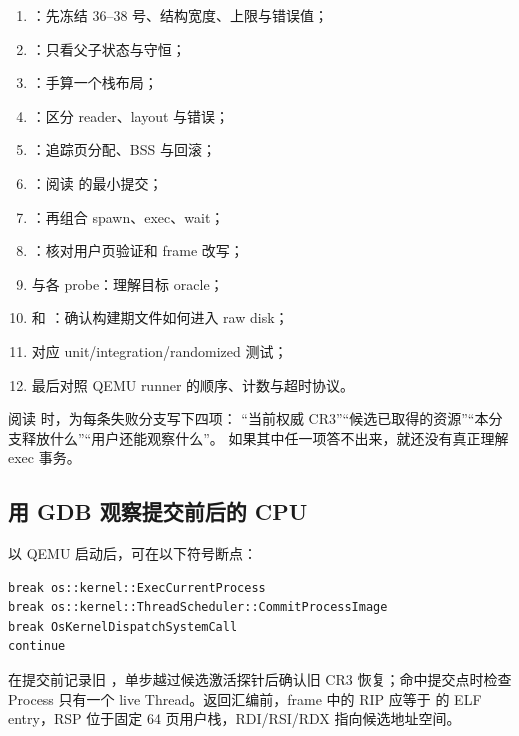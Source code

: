 \begin{enumerate}
  \item {}：先冻结 36--38
        号、结构宽度、上限与错误值；
  \item {}：只看父子状态与守恒；
  \item {}：手算一个栈布局；
  \item {}：区分 reader、layout 与错误；
  \item {}：追踪页分配、BSS 与回滚；
  \item {}：阅读
         的最小提交；
  \item {}：再组合 spawn、exec、wait；
  \item {}：核对用户页验证和 frame 改写；
  \item {} 与各 probe：理解目标 oracle；
  \item {} 和
        ：确认构建期文件如何进入 raw disk；
  \item 对应 unit/integration/randomized 测试；
  \item 最后对照 QEMU runner 的顺序、计数与超时协议。
\end{enumerate}

阅读  时，为每条失败分支写下四项：
“当前权威 CR3”“候选已取得的资源”“本分支释放什么”“用户还能观察什么”。
如果其中任一项答不出来，就还没有真正理解 exec 事务。

\subsection{用 GDB 观察提交前后的 CPU}

以 QEMU  启动后，可在以下符号断点：

\begin{lstlisting}[caption={exec 的硬件状态观察点}]
break os::kernel::ExecCurrentProcess
break os::kernel::ThreadScheduler::CommitProcessImage
break OsKernelDispatchSystemCall
continue
\end{lstlisting}

在提交前记录旧 ，单步越过候选激活探针后确认旧 CR3
恢复；命中提交点时检查 Process 只有一个 live Thread。返回汇编前，frame
中的 RIP 应等于  的 ELF entry，RSP 位于固定
64 页用户栈，RDI/RSI/RDX 指向候选地址空间。

